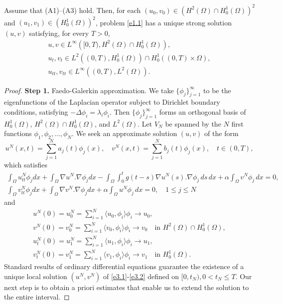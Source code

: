 \begin{theorem} \label{thm3}
 Assume that {\rm (A1)--(A3)} hold.
Then, for each $ (u_0,v_0) \in \left( H^2(\Omega) \cap H^1_0(\Omega)\right)^2$ and
$(u_1,v_1) \in \left( H^1_0(\Omega)\right)^2$, problem \eqref{e1.1} has a unique strong solution
$(u, v)$ satisfying, for every $T > 0$,
\begin{gather*}
u, v \in L^{\infty}\left( [0, T), H^2(\Omega) \cap H^1_0(\Omega)\right),\\
u_{t}, v_{t} \in L^2\left( (0, T), H^1_0(\Omega)\right)\cap H^1_0 \left( (0, T)\times \Omega\right),\\
u_{tt}, v_{tt} \in L^{\infty}\left( (0, T), L^2(\Omega)\right).
\end{gather*}
 \end{theorem}

\begin{proof} \quad

\noindent\textbf{Step 1.} Faedo-Galerkin approximation.
We take
\(\{ \phi_j \}_{j=1}^\infty\)
to be the eigenfunctions of the Laplacian operator subject to Dirichlet boundary conditions, satisfying $-\Delta \phi_i = \lambda_i \phi_i $. Then
$\{\phi_j\}_{j=1}^\infty$ forms an orthogonal basis of $ H_0^1(\Omega)$,
\( H^2(\Omega) \cap H_0^1(\Omega) \), and \( L^2(\Omega) \).
Let $V_{N}$ be spanned by the $N$ first functions $ \phi_1, \phi_2, \dots, \phi_N $.
We seek  an approximate solution $(u,v)$ of the form
\[
u^N(x,t) = \sum_{j=1}^N a_j(t) \phi_j(x), \quad
v^N(x,t) = \sum_{j=1}^N b_j(t) \phi_j(x), \quad t\in (0,T),
\]
which satisfies
\begin{gather*}
\int_\Omega u_{tt}^N \phi_j dx + \int_\Omega \nabla u^N .\nabla \phi_j dx - \int_\Omega \int_0^t g(t-s) \nabla u^N(s) .\nabla \phi_j\, ds\,dx+ \alpha \int_\Omega v^N \phi_j \, dx = 0,\\
\int_\Omega v_{tt}^N \phi_j dx + \int_\Omega \nabla v^N .\nabla \phi_j dx+ \alpha \int_\Omega u^N \phi_j \, dx = 0,\quad 1\leq j\leq N
\label{e3.1}
\end{gather*}
and
\begin{equation} \label{e3.2}
\begin{gathered}
 u^{N}(0) = u^{N}_0= \sum_{i=1}^{N} \langle u_0, \phi_i \rangle \phi_i
 \to u_0, \\
  v^{N}(0) = v^{N}_0 = \sum_{i=1}^{N} \langle v_0, \phi_i \rangle \phi_i
 \to v_0 \quad \text{in } H^2(\Omega) \cap H_0^1(\Omega), \\
 u_{t}^N(0) = u_1^N = \sum_{i=1}^{N} \langle u_1, \phi_i \rangle \phi_i \to u_{1}, \\
 v_{t}^N(0) = v_1^N = \sum_{i=1}^{N} \langle v_1, \phi_i \rangle \phi_i \to v_{1} \quad \text{in } H^1_0(\Omega).
 \end{gathered}
\end{equation}
Standard results of ordinary differential equations guarantee the existence of
a unique local solution
$ (u^N, v^N )$ of \eqref{e3.1}-\eqref{e3.2} defined on
$ [0, t_{N}), 0 < t_{N} \leq T $.
Our next step is to obtain a priori estimates that enable us to extend the
solution to the entire interval.
\smallskip


\end{proof}
